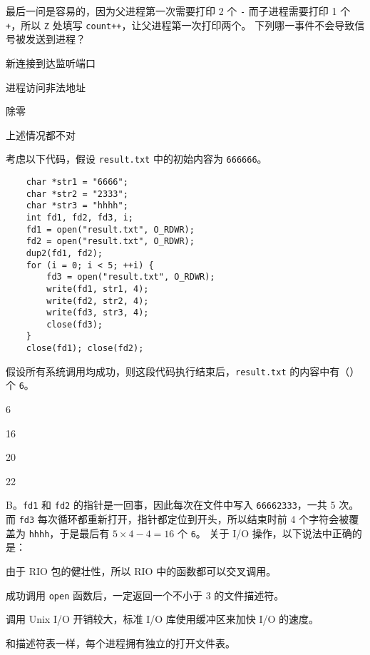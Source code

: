 \begin{problems}
        最后一问是容易的，因为父进程第一次需要打印 2 个 \verb|-| 而子进程需要打印 1 个 \verb|+|，所以 \verb|Z| 处填写 \verb|count++|，让父进程第一次打印两个。
         下列哪一事件不会导致信号被发送到进程？
        \begin{choices}
            \item 新连接到达监听端口
            \item 进程访问非法地址
            \item 除零
            \item 上述情况都不对
        \end{choices}
         考虑以下代码，假设 \verb|result.txt| 中的初始内容为 \verb|666666|。
        \begin{verbatim}
    char *str1 = "6666";
    char *str2 = "2333";
    char *str3 = "hhhh";
    int fd1, fd2, fd3, i;
    fd1 = open("result.txt", O_RDWR);
    fd2 = open("result.txt", O_RDWR);
    dup2(fd1, fd2);
    for (i = 0; i < 5; ++i) {
        fd3 = open("result.txt", O_RDWR);
        write(fd1, str1, 4);
        write(fd2, str2, 4);
        write(fd3, str3, 4);
        close(fd3);
    }
    close(fd1); close(fd2);
        \end{verbatim}
        假设所有系统调用均成功，则这段代码执行结束后，\verb|result.txt| 的内容中有（\qquad）个 \verb|6|。
        \begin{choices}
            \item 6
            \item 16
            \item 20
            \item 22
        \end{choices}
        \sol B。\verb|fd1| 和 \verb|fd2| 的指针是一回事，因此每次在文件中写入 \verb|66662333|，一共 5 次。而 \verb|fd3| 每次循环都重新打开，指针都定位到开头，所以结束时前 4 个字符会被覆盖为 \verb|hhhh|，于是最后有 $5 \times 4-4=16$ 个 \verb|6|。
         关于 I/O 操作，以下说法中正确的是：
        \begin{choices}
            \item 由于 RIO 包的健壮性，所以 RIO 中的函数都可以交叉调用。
            \item 成功调用 \verb|open| 函数后，一定返回一个不小于 3 的文件描述符。
            \item 调用 Unix I/O 开销较大，标准 I/O 库使用缓冲区来加快 I/O 的速度。
            \item 和描述符表一样，每个进程拥有独立的打开文件表。

\end{choices}
\end{problems}
